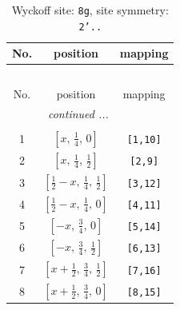 \documentclass[fleqn,8pt]{jsarticle}
\begin{document}
\begin{longtable}{ccc}
\caption{Wyckoff site: {\tt 8g}, site symmetry: {\tt 2'..}}
 \\
 \hline \hline
No. & position & mapping \\ \hline \endfirsthead

\multicolumn{2}{l}{\tablename\ \thetable{}} \\
 \hline \hline
No. & position & mapping \\ \hline \endhead

 \hline \hline
\multicolumn{2}{r}{\footnotesize\it continued ...} \\ \endfoot

 \hline \hline
\multicolumn{2}{r}{} \\ \endlastfoot

1 & $\left[ x,\, \frac{1}{4},\, 0 \right]$ & {\tt [1,10]} \\ \hline
2 & $\left[ x,\, \frac{1}{4},\, \frac{1}{2} \right]$ & {\tt [2,9]} \\ \hline
3 & $\left[ \frac{1}{2} - x,\, \frac{1}{4},\, \frac{1}{2} \right]$ & {\tt [3,12]} \\ \hline
4 & $\left[ \frac{1}{2} - x,\, \frac{1}{4},\, 0 \right]$ & {\tt [4,11]} \\ \hline
5 & $\left[ - x,\, \frac{3}{4},\, 0 \right]$ & {\tt [5,14]} \\ \hline
6 & $\left[ - x,\, \frac{3}{4},\, \frac{1}{2} \right]$ & {\tt [6,13]} \\ \hline
7 & $\left[ x + \frac{1}{2},\, \frac{3}{4},\, \frac{1}{2} \right]$ & {\tt [7,16]} \\ \hline
8 & $\left[ x + \frac{1}{2},\, \frac{3}{4},\, 0 \right]$ & {\tt [8,15]} \\
\end{longtable}
\renewcommand{\arraystretch}{1.2}
\end{document}
